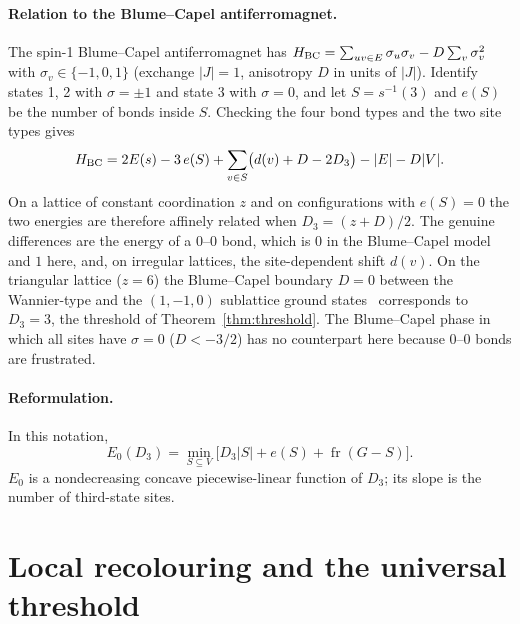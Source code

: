 \documentclass[aps,pre,twocolumn,floatfix,10pt]{revtex4-2}
\theoremstyle{definition}
\theoremstyle{remark}
\newcommand{\fr}{\operatorname{fr}}
\newcommand{\OPT}{E_0}
\begin{document}
\paragraph*{Relation to the Blume--Capel antiferromagnet.}
The spin-1 Blume--Capel antiferromagnet has $H_{\rm BC}=\sum_{uv\in E}\sigma_u\sigma_v-D\sum_v\sigma_v^2$
with $\sigma_v\in\{-1,0,1\}$ (exchange $|J|=1$, anisotropy $D$ in units of $|J|$).
Identify states 1, 2 with $\sigma=\pm1$ and state 3 with $\sigma=0$, and let $S=s^{-1}(3)$ and
$e(S)$ be the number of bonds inside $S$. Checking the four bond types and the two site types gives
\begin{equation}
H_{\rm BC}=2E(s)-3\,e(S)+\sum_{v\in S}\bigl(d(v)+D-2D_3\bigr)-|E|-D|V| .
\label{eq:BC}
\end{equation}
On a lattice of constant coordination $z$ and on configurations with $e(S)=0$ the two energies are
therefore affinely related when $D_3=(z+D)/2$. The genuine differences are the energy of a
$0$--$0$ bond, which is $0$ in the Blume--Capel model and $1$ here, and, on irregular lattices, the
site-dependent shift $d(v)$. On the triangular lattice ($z=6$) the Blume--Capel boundary $D=0$
between the Wannier-type and the $(1,-1,0)$ sublattice ground states~\cite{Zukovic2013}
corresponds to $D_3=3$, the threshold of Theorem~\ref{thm:threshold}. The Blume--Capel phase in
which all sites have $\sigma=0$ ($D<-3/2$) has no counterpart here because $0$--$0$ bonds are
frustrated.

\paragraph*{Reformulation.} In this notation,
\begin{equation}
\OPT(D_3)=\min_{S\subseteq V}\big[D_3|S|+e(S)+\fr(G-S)\big].
\label{eq:reform}
\end{equation}
$\OPT$ is a nondecreasing concave piecewise-linear function of $D_3$; its slope is the number of
third-state sites.

\section{Local recolouring and the universal threshold}
\label{sec:threshold}
\end{document}
